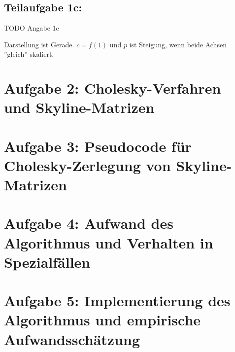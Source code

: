 \documentclass[]{article}
\begin{document}
\subsection*{Teilaufgabe 1c:}
TODO Angabe 1c

Darstellung ist Gerade. $c = f(1)$ und $p$ ist Steigung, wenn beide Achsen ''gleich'' skaliert.

\section*{Aufgabe 2: Cholesky-Verfahren und Skyline-Matrizen}

\section*{Aufgabe 3: Pseudocode für Cholesky-Zerlegung von Skyline-Matrizen}

\section*{Aufgabe 4: Aufwand des Algorithmus und Verhalten in Spezialfällen}

\section*{Aufgabe 5: Implementierung des Algorithmus und empirische Aufwandsschätzung}
\end{document}
